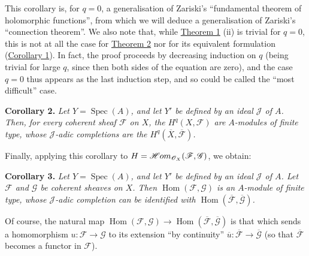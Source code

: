 \documentclass{article}
\newenvironment{itenv}[1]
  {\phantomsection\par\smallskip\noindent\textbf{#1.}\itshape}
  {\par\smallskip}
\theoremstyle{definition}
\theoremstyle{definition}
\theoremstyle{definition}
\theoremstyle{definition}
\theoremstyle{remark}
\begin{document}
This corollary is, for \(q=0\), a generalisation of Zariski's ``fundamental theorem of holomorphic functions'', from which we will deduce a generalisation of Zariski's ``connection theorem''.
We also note that, while \protect\hyperlink{fga-2-theorem-1}{Theorem 1} (ii) is trivial for \(q=0\), this is not at all the case for \protect\hyperlink{fga-2-theorem-2}{Theorem 2} nor for its equivalent formulation (\protect\hyperlink{fga-2-theorem-2-corollary-1}{Corollary 1}).
In fact, the proof proceeds by decreasing induction on \(q\) (being trivial for large \(q\), since then both sides of the equation are zero), and the case \(q=0\) thus appears as the last induction step, and so could be called the ``most difficult'' case.

\leavevmode{}%
\begin{itenv}{Corollary 2}
Let \(Y=\operatorname{Spec}(A)\), and let \(Y'\) be defined by an ideal \({\mathscr{J}}\) of \(A\).
Then, for every coherent sheaf \({\mathscr{F}}\) on \(X\), the \(H^q(X,{\mathscr{F}})\) are \(A\)-modules of finite type, whose \({\mathscr{J}}\)-adic completions are the \(H^q(\overline{X},\overline{{\mathscr{F}}})\).

\end{itenv}

Finally, applying this corollary to \(H=\mathscr{H}\kern -.5pt om_{{\mathscr{O}}_X}({\mathscr{F}},{\mathscr{G}})\), we obtain:

\leavevmode{}%
\begin{itenv}{Corollary 3}
Let \(Y=\operatorname{Spec}(A)\), and let \(Y'\) be defined by an ideal \({\mathscr{J}}\) of \(A\).
Let \({\mathscr{F}}\) and \({\mathscr{G}}\) be coherent sheaves on \(X\).
Then \(\operatorname{Hom}({\mathscr{F}},{\mathscr{G}})\) is an \(A\)-module of finite type, whose \({\mathscr{J}}\)-adic completion can be identified with \(\operatorname{Hom}(\overline{{\mathscr{F}}},\overline{{\mathscr{G}}})\).

\end{itenv}

Of course, the natural map \(\operatorname{Hom}({\mathscr{F}},{\mathscr{G}})\to\operatorname{Hom}(\overline{{\mathscr{F}}},\overline{{\mathscr{G}}})\) is that which sends a homomorphism \(u\colon{\mathscr{F}}\to{\mathscr{G}}\) to its extension ``by continuity'' \(\overline{u}\colon\overline{{\mathscr{F}}}\to\overline{{\mathscr{G}}}\) (so that \(\overline{{\mathscr{F}}}\) becomes a functor in \({\mathscr{F}}\)).
\end{document}
